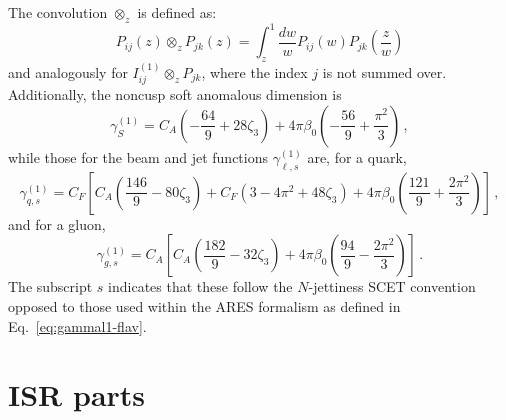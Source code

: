 The convolution $\otimes_z$ is defined as:
\begin{equation}
P_{ij}(z)\otimes_z P_{jk}(z)=\int_z^1\frac{dw}{w}P_{ij}(w)P_{jk}\left(\frac{z}{w}\right)
\end{equation}
and analogously for $I_{ij}^{(1)}\otimes_z P_{jk}$, where the index $j$ is not summed over. 
Additionally,  the noncusp soft anomalous dimension is
\begin{equation}
\gamma_S^{(1)}=C_A\left(-\frac{64}{9}+28\zeta_3\right)+4\pi\beta_0\left(-\frac{56}{9}+\frac{\pi^2}{3}\right)\,,
\end{equation}
while those for the beam and jet functions $\gamma^{(1)}_{\ell,s}$ are, for a quark,
\begin{equation}
\gamma_{q,s}^{(1)}=C_F\left[C_A\left(\frac{146}{9}-80\zeta_3\right)+C_F(3-4\pi^2+48\zeta_3)+4\pi\beta_0\left(\frac{121}{9}+\frac{2\pi^2}{3}\right)\right]\,,
\end{equation}
and for a gluon,
\begin{equation}
\gamma_{g,s}^{(1)}=C_A\left[C_A\left(\frac{182}{9}-32\zeta_3\right)+4\pi\beta_0\left(\frac{94}{9}-\frac{2\pi^2}{3}\right)\right]\,.
\end{equation}
The subscript $s$ indicates that these follow the $N$-jettiness SCET convention opposed to 
those used within the \textsc{ARES} formalism as defined in Eq.~\eqref{eq:gammal1-flav}.


\section{ISR parts}
